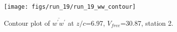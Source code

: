 \begin{figure}[H]
\centering
\texttt{[image: figs/run\_19/run\_19\_ww\_contour]}
\caption{Contour plot of $\overline{w^\prime w^\prime}$ at $z/c$=6.97, $V_{free}$=30.87, station 2.}
\label{fig:run_19_ww_contour}
\end{figure}


